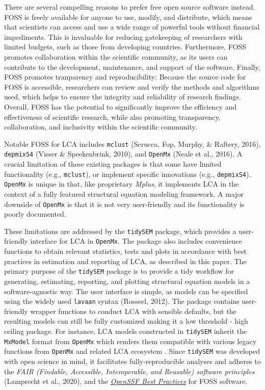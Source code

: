 \documentclass[
  ,man,floatsintext]{apa6}
\begin{document}
There are several compelling reasons to prefer free open source software instead.
FOSS is freely available for anyone to use, modify, and distribute, which means that scientists can access and use a wide range of powerful tools without financial impediments.
This is invaluable for reducing gatekeeping of researchers with limited budgets, such as those from developing countries.
Furthermore, FOSS promotes collaboration within the scientific community,
as its users can contribute to the development, maintenance, and support of the software.
Finally, FOSS promotes tranparency and reproducibility: Because the source code for FOSS is accessible,
researchers can review and verify the methods and algorithms used,
which helps to ensure the integrity and reliability of research findings.
Overall, FOSS has the potential to significantly improve the efficiency and effectiveness of scientific research, while also promoting transparency, collaboration, and inclusivity within the scientific community.

Notable FOSS for LCA includes \texttt{mclust} (Scrucca, Fop, Murphy, \& Raftery, 2016), \texttt{depmixS4} (Visser \& Speekenbrink, 2010), and \texttt{OpenMx} (Neale et al., 2016).
A crucial limitation of these existing packages is that some have limited functionality (e.g., \texttt{mclust}),
or implement specific innovations (e.g., \texttt{depmixS4}).
\texttt{OpenMx} is unique in that, like proprietary \emph{Mplus}, it implements LCA in the context of a fully featured structural equation modeling framework.
A major downside of \texttt{OpenMx} is that it is not very user-friendly and its functionality is poorly documented.

These limitations are addressed by the \texttt{tidySEM} package,
which provides a user-friendly interface for LCA in \texttt{OpenMx}.
The package also includes convenience functions to obtain relevant statistics, tests and plots in accordance with best practices in estimation and reporting of LCA, as described in this paper.
The primary purpose of the \texttt{tidySEM} package is to provide a tidy workflow for generating, estimating, reporting, and plotting structural equation models in a software-agnostic way.
The user interface is simple, as models can be specified using the widely used \texttt{lavaan} syntax (Rosseel, 2012).
The package contains user-friendly wrapper functions to conduct LCA with sensible defaults,
but the resulting models can still be fully customized making it a low threshold - high ceiling package.
For instance, LCA models constructed in \texttt{tidySEM} inherit the \texttt{MxModel} format from \texttt{OpenMx} which renders them compatible with various legacy functions from \texttt{OpenMx} and related LCA ecosystem .
Since \texttt{tidySEM} was developed with open science in mind, it facilitates fully-reproducible analyses and adheres to the \emph{FAIR (Findable, Accessible, Interoperable, and Reusable) software principles} (Lamprecht et al., 2020),
and the \href{https://bestpractices.coreinfrastructure.org/en/criteria}{\emph{OpenSSF Best Practices}} for FOSS software.
\end{document}
